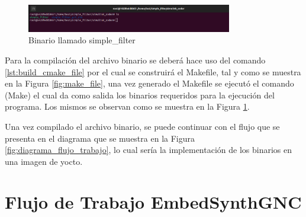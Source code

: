 \begin{figure}[h!]
    \centering
    \includegraphics[width=0.8\textwidth]{fig/especifico_2/M2MT/paso_a_paso_mtmt/binario_compilado.pdf}
    \caption{Binario llamado simple\_filter}
    \label{fig:binario_compilado}
\end{figure}

Para la compilación del archivo binario se deberá hace uso del comando \ref{lst:build_cmake_file} por el cual se construirá el Makefile, tal y como se muestra en la Figura \ref{fig:make_file}, una vez generado el Makefile se ejecutó el comando (Make) el cual da como salida los binarios requeridos para la ejecución del programa. Los mismos se observan como se muestra en la Figura \ref{fig:binario_compilado}.

Una vez compilado el archivo binario, se puede continuar con el flujo que se presenta en el diagrama que se muestra en la Figura \ref{fig:diagrama_flujo_trabajo}, lo cual sería la implementación de los binarios en una imagen de yocto.
\newpage

\section{Flujo de Trabajo EmbedSynthGNC}

